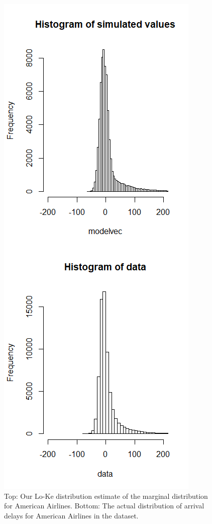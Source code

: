 \documentclass[12pt, a4paper, openany]{book}
\begin{document}
			\begin{figure}[h]
			\centering
	 		\includegraphics[width = .5 \textwidth]{../figures/carrierAA}
	 		\caption{Top: Our Lo-Ke distribution estimate of the marginal distribution for American Airlines. Bottom: The actual distribution of arrival delays for American Airlines in the dataset.}
	 		\end{figure}	
\end{document}
